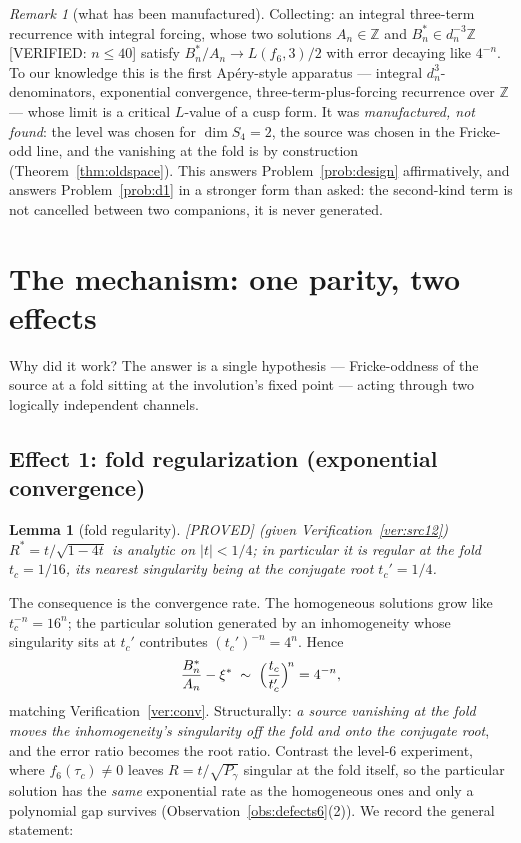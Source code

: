 \documentclass[11pt,reqno]{amsart}
\theoremstyle{plain}
\newtheorem{lemma}[theorem]{Lemma}
\theoremstyle{definition}
\theoremstyle{remark}
\newtheorem{remark}[theorem]{Remark}
\newcommand{\Z}{\mathbb{Z}}
\newcommand{\Proved}{\textup{\textsf{[PROVED]}}}
\newcommand{\VerifiedR}[1]{\textup{\textsf{[VERIFIED: #1]}}}
\begin{document}
\begin{remark}[what has been manufactured]
Collecting: an integral three-term recurrence with integral forcing, whose
two solutions $A_n\in\Z$ and $B^*_n\in d_n^{-3}\Z$ \VerifiedR{$n\le40$}
satisfy $B^*_n/A_n\to L(f_6,3)/2$ with error decaying like $4^{-n}$. To our
knowledge this is the first Ap\'ery-style apparatus --- integral
$d_n^3$-denominators, exponential convergence, three-term-plus-forcing
recurrence over $\Z$ --- whose limit is a critical $L$-value of a cusp
form. It was \emph{manufactured, not found}: the level was chosen for
$\dim S_4=2$, the source was chosen in the Fricke-odd line, and the
vanishing at the fold is by construction (Theorem~\ref{thm:oldspace}).
This answers Problem~\ref{prob:design} affirmatively, and answers
Problem~\ref{prob:d1} in a stronger form than asked: the second-kind term
is not cancelled between two companions, it is never generated.
\end{remark}

\section{The mechanism: one parity, two effects}\label{sec:mech}

Why did it work? The answer is a single hypothesis --- Fricke-oddness of
the source at a fold sitting at the involution's fixed point --- acting
through two logically independent channels.

\subsection{Effect 1: fold regularization (exponential convergence)}
\begin{lemma}[fold regularity]\label{lem:regular}
\Proved{} \emph{(given Verification~\ref{ver:src12})}
$R^*=t/\sqrt{1-4t}$ is analytic on $|t|<1/4$; in particular it is regular
at the fold $t_c=1/16$, its nearest singularity being at the conjugate root
$t_c'=1/4$.
\end{lemma}

The consequence is the convergence rate. The homogeneous solutions grow
like $t_c^{-n}=16^n$; the particular solution generated by an
inhomogeneity whose singularity sits at $t_c'$ contributes
$(t_c')^{-n}=4^n$. Hence
\[
\frac{B^*_n}{A_n}-\xi^*\;\sim\;\Bigl(\frac{t_c}{t_c'}\Bigr)^{\!n}
=4^{-n},
\]
matching Verification~\ref{ver:conv}. Structurally: \emph{a source
vanishing at the fold moves the inhomogeneity's singularity off the fold
and onto the conjugate root}, and the error ratio becomes the root ratio.
Contrast the level-$6$ experiment, where $f_6(\tau_c)\ne0$ leaves
$R=t/\sqrt{P_\gamma}$ singular at the fold itself, so the particular
solution has the \emph{same} exponential rate as the homogeneous ones and
only a polynomial gap survives (Observation~\ref{obs:defects6}(2)). We
record the general statement:
\end{document}

